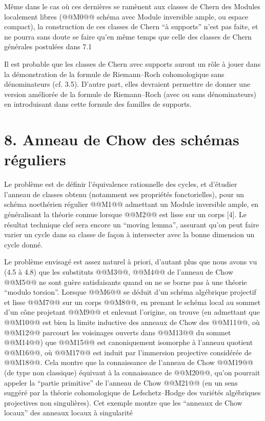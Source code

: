 
Même
dans le cas où ces dernières se ramènent aux classes de Chern des Modules localement libres (@@M0@@ schéma avec Module inversible ample, ou espace compact), la construction de ces classes de Chern ``à supports'' n'est pas faite, et ne pourra sans doute se faire qu'en même temps que celle des classes de Chern générales postulées dans 7.1

Il est probable que les classes de Chern avec supports auront un rôle à jouer dans la démonstration de la formule de Riemann--Roch cohomologique sans dénominateurs (cf. 3.5). D'autre part, elles devraient permettre de donner une version améliorée de la formule de Riemann--Roch (avec ou sans dénominateurs) en introduisant dans cette formule des familles de supports.

\section*{8. Anneau de Chow des schémas réguliers}

Le problème est de définir l'équivalence rationnelle des cycles, et d'étudier l'anneau de classes obtenu (notamment ses propriétés fonctorielles), pour un schéma noethérien régulier @@M1@@ admettant un Module inversible ample, en généralisant la théorie connue lorsque @@M2@@ est lisse sur un corps [4]. Le résultat technique clef sera encore un ``moving lemma'', assurant qu'on peut faire varier un cycle dans sa classe de façon à intersecter avec la bonne dimension un cycle donné.

Le problème envisagé est assez naturel à priori, d'autant plus que nous avons vu (4.5 à 4.8) que les substituts @@M3@@, @@M4@@ de l'anneau de Chow @@M5@@ ne sont guère satisfaisants quand on ne se borne pas à une théorie ``modulo torsion''. Lorsque @@M6@@ se déduit d'un schéma algébrique projectif et lisse @@M7@@ sur un corps @@M8@@, en prenant le schéma local au sommet d'un cône projetant @@M9@@ et enlevant l'origine, on trouve (en admettant que @@M10@@ est bien la limite inductive des anneaux de Chow des @@M11@@, où @@M12@@ parcourt les voisinages ouverts dans @@M13@@ du sommet @@M14@@) que @@M15@@ est canoniquement isomorphe à l'anneau quotient @@M16@@, où @@M17@@ est induit par l'immersion projective considérée de @@M18@@. Cela montre que la connaissance de l'anneau de Chow @@M19@@ (de type non classique) équivaut à la connaissance de @@M20@@, qu'on pourrait appeler la ``partie primitive'' de l'anneau de Chow @@M21@@ (en un sens suggéré par la théorie cohomologique de Lefschetz--Hodge des variétés algébriques projectives non singulières). Cet exemple montre que les ``anneaux de Chow locaux'' des anneaux locaux à singularité

